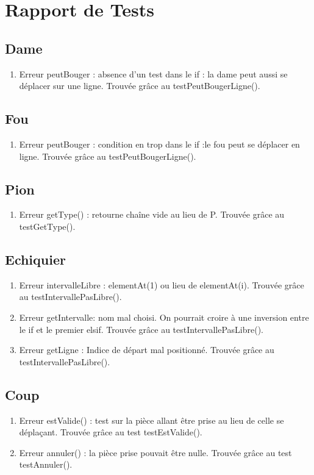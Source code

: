 \chapter{Rapport de Tests}

\section{Dame}
\begin{enumerate}
\item
Erreur peutBouger : absence d'un test dans le if : la dame peut aussi se déplacer sur une ligne. Trouvée grâce au testPeutBougerLigne().
\end{enumerate}

\section{Fou}
\begin{enumerate}
\item
Erreur peutBouger : condition en trop dans le if :le fou peut se déplacer en ligne.  Trouvée grâce au testPeutBougerLigne().
\end{enumerate}

\section{Pion}
\begin{enumerate}
\item
Erreur getType() : retourne chaîne vide au lieu de P.  Trouvée grâce au testGetType().
\end{enumerate}


\section{Echiquier}
\begin{enumerate}
\item
Erreur intervalleLibre : elementAt(1) ou lieu de elementAt(i). Trouvée grâce au testIntervallePasLibre().
\item
Erreur getIntervalle: nom mal choisi. On pourrait croire à une inversion entre le if et le premier elsif. Trouvée grâce au testIntervallePasLibre().
\item
Erreur getLigne : Indice de départ mal positionné. Trouvée grâce au testIntervallePasLibre().
\end{enumerate}

\section{Coup}
\begin{enumerate}
\item
Erreur estValide() : test sur la pièce allant être prise au lieu de celle se déplaçant. Trouvée grâce au test testEstValide().
\item
Erreur annuler() : la pièce prise pouvait être nulle. Trouvée grâce au test testAnnuler().
\end{enumerate}

